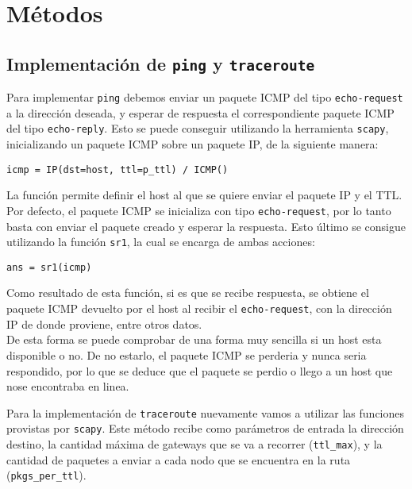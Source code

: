 \section{M\'etodos}
 
 \subsection{Implementaci\'on de \texttt{ping} y \texttt{traceroute}}
 
 Para implementar \texttt{ping} debemos enviar un paquete ICMP del tipo \texttt{echo-request} a la direcci\'on deseada, y esperar de respuesta el correspondiente paquete ICMP del tipo \texttt{echo-reply}. Esto se puede conseguir utilizando la herramienta \texttt{scapy}, inicializando un paquete ICMP sobre un paquete IP, de la siguiente manera:\\
 
 \begin{center}
    \texttt{icmp = IP(dst=host, ttl=p\_ttl) / ICMP()}
 \end{center}
 
 La funci\'on permite definir el host al que se quiere enviar el paquete IP y el TTL. Por defecto, el paquete ICMP se inicializa con tipo \texttt{echo-request}, por lo tanto basta con enviar el paquete creado y esperar la respuesta. Esto \'ultimo se consigue utilizando la funci\'on \texttt{sr1}, la cual se encarga de ambas acciones:
 
 \begin{center}
    \texttt{ans = sr1(icmp)}
 \end{center}
 
 Como resultado de esta funci\'on, si es que se recibe respuesta, se obtiene el paquete ICMP devuelto por el host al recibir el \texttt{echo-request}, con la direcci\'on IP de donde proviene, entre otros datos.\\
  
 De esta forma se puede comprobar de una forma muy sencilla si un host esta disponible o no. De no estarlo, el paquete ICMP se perderia y nunca seria respondido, por lo que se deduce que el paquete se perdio o llego a un host que nose encontraba en linea.
 
 Para la implementaci\'on de \texttt{traceroute} nuevamente vamos a utilizar las funciones provistas por \texttt{scapy}. Este m\'etodo recibe como par\'ametros de entrada la direcci\'on destino, la cantidad m\'axima de gateways que se va a recorrer (\texttt{ttl\_max}), y la cantidad de paquetes a enviar a cada nodo que se encuentra en la ruta (\texttt{pkgs\_per\_ttl}).\\
 
